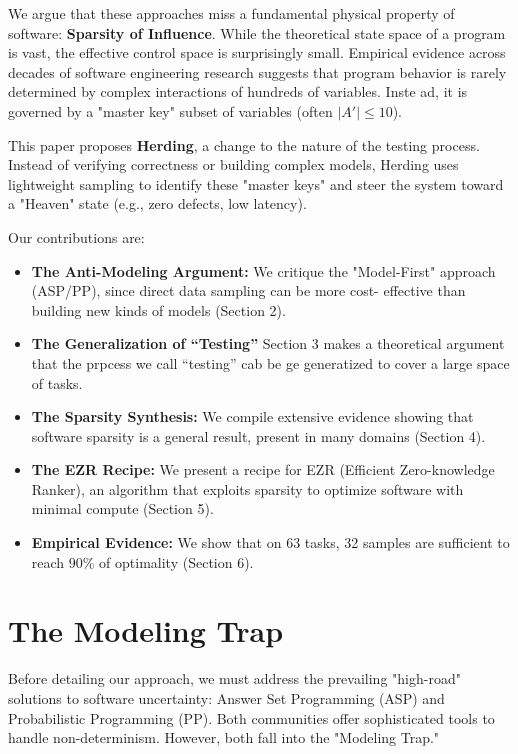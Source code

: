 \documentclass[pdflatex,sn-basic]{sn-jnl}
\begin{document}
We argue that these approaches miss a fundamental physical property of 
software: \textbf{Sparsity of Influence}. While the theoretical state space of 
a program is vast, the effective control space is surprisingly small. 
Empirical evidence across decades of software engineering research suggests 
that program behavior is rarely determined by complex interactions of hundreds 
of variables. Inste ad, it is governed by a "master key" subset of variables 
(often $|A'| \le 10$).

This paper proposes \textbf{Herding}, a change to the nature of the testing 
process. Instead of verifying correctness or building complex  models, 
Herding uses lightweight sampling to identify these "master keys" and steer 
the system toward a "Heaven" state (e.g., zero defects, low latency).

Our contributions are:
\begin{itemize}
    \item \textbf{The Anti-Modeling Argument:} We critique the "Model-First" 
    approach (ASP/PP), since  direct data sampling can be more cost-
    effective than building new kinds of models (Section 2).
        \item \textbf{The Generalization
        of ``Testing'' }  Section 3 makes a theoretical argument that the prpcess we call ``testing'' cab be ge generatized to cover a large space of tasks. 
    \item \textbf{The Sparsity Synthesis:} We compile extensive evidence 
    showing that software sparsity is a general result, present in many domains  (Section 4).
    \item \textbf{The EZR Recipe:} We present a 
    recipe for EZR (Efficient Zero-knowledge Ranker), an algorithm that 
    exploits sparsity to optimize software with minimal compute (Section 5).
    \item \textbf{Empirical Evidence:} We show that on 63 tasks, 32 samples are 
    sufficient to reach 90\% of  optimality (Section 6).
\end{itemize}

\section{The Modeling Trap }
Before detailing our approach, we must address the prevailing "high-road" 
solutions to software uncertainty: Answer Set Programming (ASP) and 
Probabilistic Programming (PP). Both communities offer sophisticated tools 
to handle non-determinism. However, both fall into the "Modeling Trap."
\end{document}
